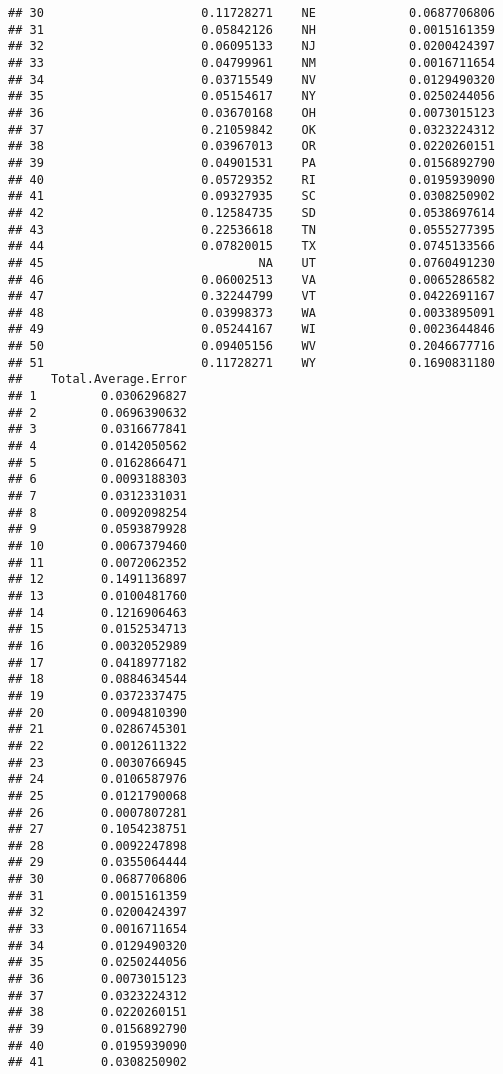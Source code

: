 \documentclass{article}\usepackage[]{graphicx}\usepackage[]{color}
\makeatletter
\newenvironment{kframe}{%
 \def\at@end@of@kframe{}%
 \ifinner\ifhmode%
  \def\at@end@of@kframe{\end{minipage}}%
  \begin{minipage}{\columnwidth}%
 \fi\fi%
 \def\FrameCommand##1{\hskip\@totalleftmargin \hskip-\fboxsep
 \colorbox{shadecolor}{##1}\hskip-\fboxsep
     \hskip-\linewidth \hskip-\@totalleftmargin \hskip\columnwidth}%
 \MakeFramed {\advance\hsize-\width
   \@totalleftmargin\z@ \linewidth\hsize
   \@setminipage}}%
 {\par\unskip\endMakeFramed%
 \at@end@of@kframe}
\newenvironment{knitrout}{}{} %
\makeatother
\begin{document}
\begin{knitrout}
\begin{kframe}
\begin{verbatim}
## 30                      0.11728271    NE             0.0687706806
## 31                      0.05842126    NH             0.0015161359
## 32                      0.06095133    NJ             0.0200424397
## 33                      0.04799961    NM             0.0016711654
## 34                      0.03715549    NV             0.0129490320
## 35                      0.05154617    NY             0.0250244056
## 36                      0.03670168    OH             0.0073015123
## 37                      0.21059842    OK             0.0323224312
## 38                      0.03967013    OR             0.0220260151
## 39                      0.04901531    PA             0.0156892790
## 40                      0.05729352    RI             0.0195939090
## 41                      0.09327935    SC             0.0308250902
## 42                      0.12584735    SD             0.0538697614
## 43                      0.22536618    TN             0.0555277395
## 44                      0.07820015    TX             0.0745133566
## 45                              NA    UT             0.0760491230
## 46                      0.06002513    VA             0.0065286582
## 47                      0.32244799    VT             0.0422691167
## 48                      0.03998373    WA             0.0033895091
## 49                      0.05244167    WI             0.0023644846
## 50                      0.09405156    WV             0.2046677716
## 51                      0.11728271    WY             0.1690831180
##    Total.Average.Error
## 1         0.0306296827
## 2         0.0696390632
## 3         0.0316677841
## 4         0.0142050562
## 5         0.0162866471
## 6         0.0093188303
## 7         0.0312331031
## 8         0.0092098254
## 9         0.0593879928
## 10        0.0067379460
## 11        0.0072062352
## 12        0.1491136897
## 13        0.0100481760
## 14        0.1216906463
## 15        0.0152534713
## 16        0.0032052989
## 17        0.0418977182
## 18        0.0884634544
## 19        0.0372337475
## 20        0.0094810390
## 21        0.0286745301
## 22        0.0012611322
## 23        0.0030766945
## 24        0.0106587976
## 25        0.0121790068
## 26        0.0007807281
## 27        0.1054238751
## 28        0.0092247898
## 29        0.0355064444
## 30        0.0687706806
## 31        0.0015161359
## 32        0.0200424397
## 33        0.0016711654
## 34        0.0129490320
## 35        0.0250244056
## 36        0.0073015123
## 37        0.0323224312
## 38        0.0220260151
## 39        0.0156892790
## 40        0.0195939090
## 41        0.0308250902

\end{verbatim}
\end{kframe}
\end{knitrout}
\end{document}
